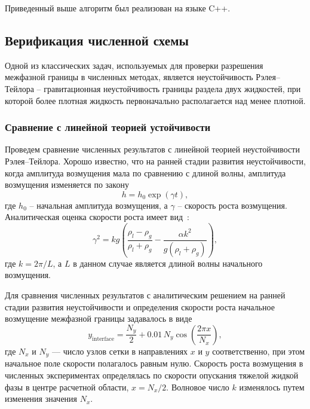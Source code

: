 \documentclass[12pt,a4paper]{article}
\begin{document}
Приведенный выше алгоритм был реализован на языке C++. 



\subsection{Верификация численной схемы}

Одной из классических задач, используемых для проверки разрешения межфазной границы в численных методах, является неустойчивость Рэлея--Тейлора -- гравитационная неустойчивость границы раздела двух жидкостей, при которой более плотная жидкость первоначально располагается над менее плотной.

\subsubsection{Сравнение с линейной теорией устойчивости}

Проведем сравнение численных результатов с линейной теорией неустойчивости Рэлея--Тейлора. Хорошо известно, что на ранней стадии развития неустойчивости, когда амплитуда возмущения мала по сравнению с длиной волны, амплитуда возмущения изменяется по закону
%
\begin{equation*}
	h = h_0 \exp(\gamma t),
\end{equation*}
%
где $h_0$ -- начальная амплитуда возмущения, а $\gamma$ -- скорость роста возмущения. Аналитическая оценка скорости роста имеет вид~\cite{Chandrasekhar1981}:
\begin{equation*}
	\gamma^2 = kg\left(\frac{\rho_l - \rho_g}{\rho_l + \rho_g}
	- \frac{\alpha k^2}{g\left(\rho_l + \rho_g\right)}\right),
\end{equation*}
где $k = 2\pi/L$, а $L$ в данном случае является длиной волны начального возмущения.

Для сравнения численных результатов с аналитическим решением на ранней стадии развития неустойчивости и определения скорости роста начальное возмущение межфазной границы задавалось в виде
%
\begin{equation*}
	y_{\mathrm{interface}} = \frac{N_y}{2}
	+ 0.01\,N_y \cos\!\left(\frac{2\pi x}{N_x}\right),
\end{equation*}
%
где $N_x$ и $N_y$ --- число узлов сетки в направлениях $x$ и $y$ соответственно, при этом начальное поле скорости полагалось равным нулю. Скорость роста возмущения в численных экспериментах определялась по скорости опускания тяжелой жидкой фазы в центре расчетной области, $x = N_x/2$. Волновое число $k$ изменялось путем изменения значения $N_x$.
\end{document}
